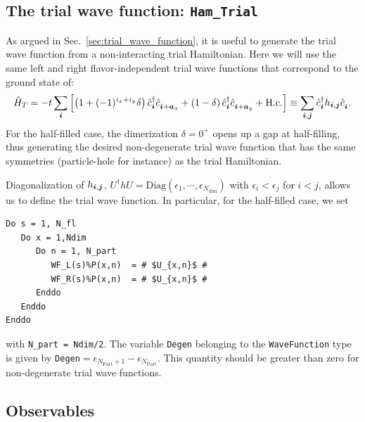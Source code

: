 \subsection{The trial wave function: \texttt{Ham\_Trial}} \label{U_PV_Ham_Trial}
\label{Sec:Plain_vanilla_trial}
As  argued in Sec.~\ref{sec:trial_wave_function}, it is useful to generate the trial wave function from a non-interacting trial Hamiltonian.   Here we will  use the same left and right  flavor-independent trial wave functions that correspond to the ground state of: 
\begin{equation}
   \hat{H}_T    = - t \sum_{\ve{i}} \left[  \left( 1 + (-1)^{i_x + i_y}  \delta \right)  \hat{c}^{\dagger}_{\ve{i}}   \hat{c}^{\phantom\dagger}_{\ve{i} +\ve{a}_x}  +  
   							\left(1 - \delta \right)  \hat{c}^{\dagger}_{\ve{i}}   \hat{c}^{\phantom\dagger}_{\ve{i} +\ve{a}_y}    + \hc  \right]   \equiv   \sum_{\ve{i},\ve{j}}  \hat{c}^{\dagger}_{\ve{i}}   h_{\ve{i},\ve{j}}  \hat{c}^{\phantom\dagger}_{\ve{i}}.
\end{equation}
For the half-filled case, the  dimerization $\delta  = 0^{+} $  opens up a gap at  half-filling,   thus generating the desired  non-degenerate  trial wave function  that has the same symmetries (particle-hole  for instance) as  the   trial  Hamiltonian.

Diagonalization  of  $ h_{\boldsymbol{i},\boldsymbol{j}}$,      $U^{\dagger} h  U  = \mathrm{Diag} \left(   \epsilon_1, \cdots, \epsilon_{N_{\mathrm{dim}}} \right) $     with  $\epsilon_i  <  \epsilon_j $  for $i < j$, allows us  to define the  trial wave function.  In particular, for the half-filled case, we set 
\begin{lstlisting}[style=fortran,escapechar=\#]
Do s = 1, N_fl
   Do x = 1,Ndim
      Do n = 1, N_part
         WF_L(s)%P(x,n)  = # $U_{x,n}$ #
         WF_R(s)%P(x,n)  = # $U_{x,n}$ #
      Enddo
   Enddo
Enddo
\end{lstlisting}
with \texttt{N\_part = Ndim/2}.     The  variable \texttt{Degen}   belonging to the \texttt{WaveFunction}  type  is given by  \texttt{Degen}$=\epsilon_{N_{\mathrm{Part}} +1 } - \epsilon_{N_{\mathrm{Part}}  }$.   This quantity should be greater than zero  for non-degenerate trial wave functions. 

\subsection{Observables}


